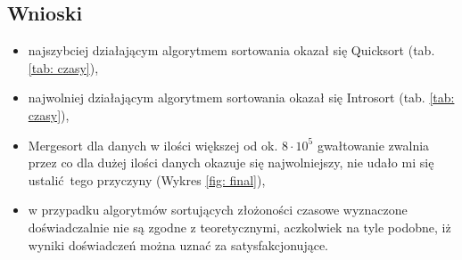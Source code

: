 \documentclass[12pt]{article}
\begin{document}
       \subsection{Wnioski}
       \begin{itemize}
              \item najszybciej działającym algorytmem sortowania okazał się Quicksort (tab. \ref{tab: czasy}),
              \item najwolniej działającym algorytmem sortowania okazał się Introsort (tab. \ref{tab: czasy}),
              \item Mergesort dla danych w ilości większej od ok.  $8 \cdot 10^5$ gwałtowanie zwalnia przez co dla dużej ilości danych okazuje się najwolniejszy, nie udało mi się ustalić tego przyczyny (Wykres \ref{fig: final}),
              \item w przypadku algorytmów sortujących złożoności czasowe wyznaczone doświadczalnie nie są zgodne z teoretycznymi, aczkolwiek na tyle podobne,
              iż wyniki doświadczeń można uznać za satysfakcjonujące.
       \end{itemize}
\end{document}
